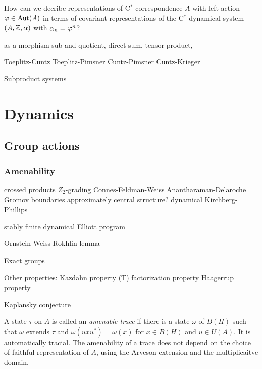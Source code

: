 \documentclass{../../large}
\begin{document}
How can we decribe representations of C$^*$-correspondence $A$ with left action $\varphi\in\operatorname{Aut}(A)$ in terms of covariant representations of the C$^*$-dynamical system $(A,\mathbb{Z},\alpha)$ with $\alpha_n=\varphi^n$?



as a morphism
sub and quotient, direct sum, tensor product,

Toeplitz-Cuntz
Toeplitz-Pimsner
Cuntz-Pimsner
Cuntz-Krieger



Subproduct systems




















\part{Dynamics}






\chapter{Group actions}

\section{Amenability}



crossed products
$Z_2$-grading
Connes-Feldman-Weiss
Anantharaman-Delaroche
Gromov boundaries
approximately central structure?
dynamical Kirchberg-Phillips

stably finite
dynamical Elliott program

Ornstein-Weiss-Rokhlin lemma



Exact groups


Other properties:
Kazdahn property (T)
factorization property
Haagerrup property


Kaplansky conjecture




A state $\tau$ on $A$ is called an \emph{amenable trace} if there is a state $\omega$ of $B(H)$ such that $\omega$ extends $\tau$ and $\omega(uxu^*)=\omega(x)$ for $x\in B(H)$ and $u\in U(A)$.
It is automatically tracial.
The amenability of a trace does not depend on the choice of faithful representation of $A$, using the Arveson extension and the multiplicaitve domain.
\end{document}
